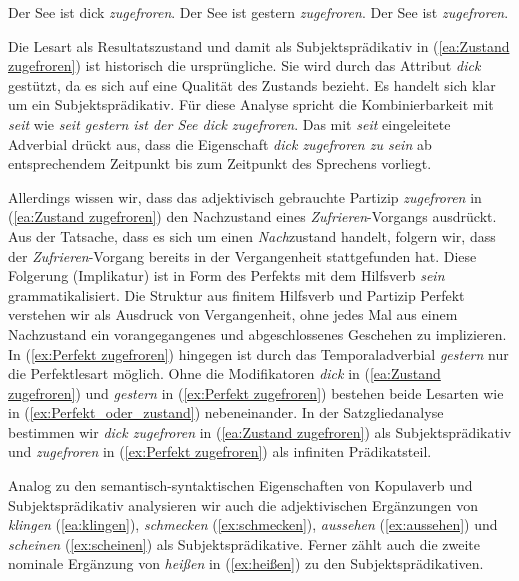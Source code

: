 \newpage
\ea \label{ea:Perfekt Zustand}
\ea \label{ea:Zustand zugefroren} Der See ist dick \textit{zugefroren}.
\ex \label{ex:Perfekt zugefroren} Der See ist gestern \textit{zugefroren}.
\ex \label{ex:Perfekt_oder_zustand} Der See ist \textit{zugefroren}.
\z 
\z 

Die Lesart als Resultatszustand und damit als Subjektsprädikativ in (\ref{ea:Zustand zugefroren}) ist historisch die ursprüngliche. Sie wird durch das Attribut \textit{dick} gestützt, da es sich auf eine Qualität des Zustands bezieht. Es handelt sich klar um ein Subjektsprädikativ. Für diese Analyse spricht die Kombinierbarkeit mit \textit{seit} wie \textit{seit gestern ist der See dick zugefroren}. Das mit \textit{seit} eingeleitete Adverbial drückt aus, dass die Eigenschaft \textit{dick zugefroren zu sein} ab entsprechendem Zeitpunkt bis zum Zeitpunkt des Sprechens vorliegt.    

Allerdings wissen wir, dass das adjektivisch gebrauchte Partizip \textit{zugefroren} in (\ref{ea:Zustand zugefroren}) den Nachzustand eines \textit{Zufrieren}-Vorgangs ausdrückt. Aus der Tatsache, dass es sich um einen \textit{Nach}zustand handelt, folgern wir, dass der \textit{Zufrieren}-Vorgang bereits in der Vergangenheit stattgefunden hat. Diese Folgerung (Implikatur) ist in Form des Perfekts mit dem Hilfsverb \textit{sein} grammatikalisiert. Die Struktur aus finitem Hilfsverb und Partizip Perfekt verstehen wir als Ausdruck von Vergangenheit, ohne jedes Mal aus einem Nachzustand ein vorangegangenes und abgeschlossenes Geschehen zu implizieren. In (\ref{ex:Perfekt zugefroren}) hingegen ist durch das Temporaladverbial \textit{gestern} nur die Perfektlesart möglich. Ohne die Modifikatoren \textit{dick} in (\ref{ea:Zustand zugefroren}) und \textit{gestern} in (\ref{ex:Perfekt zugefroren}) bestehen beide Lesarten wie in (\ref{ex:Perfekt_oder_zustand}) nebeneinander. In der Satzgliedanalyse bestimmen wir \textit{dick zugefroren} in (\ref{ea:Zustand zugefroren}) als Subjektsprädikativ und \textit{zugefroren} in (\ref{ex:Perfekt zugefroren}) als infiniten Prädikatsteil.  

Analog zu den semantisch-syntaktischen Eigenschaften von Kopulaverb und Subjektsprädikativ analysieren wir auch die adjektivischen Ergänzungen von \textit{klingen} (\ref{ea:klingen}), \textit{schmecken} (\ref{ex:schmecken}), \textit{aussehen} (\ref{ex:aussehen}) und \textit{scheinen} (\ref{ex:scheinen}) als Subjektsprädikative. Ferner zählt auch die zweite nominale Ergänzung von \textit{heißen} in (\ref{ex:heißen}) zu den Subjektsprädikativen.

